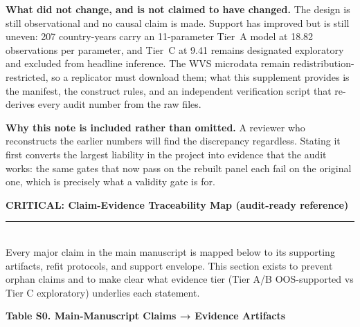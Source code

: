 \documentclass[11pt]{article}
\newcommand{\SubRule}{\color{black}\rule{\linewidth}{0.4pt}}
\newcommand{\Section}[1]{\noindent\textbf{#1}\\[-0.25em]\SubRule\\[0.1em]}
\begin{document}
\noindent\justifying
\textbf{What did not change, and is not claimed to have changed.} The design is still observational and no causal claim is made. Support has improved but is still uneven: 207 country-years carry an 11-parameter Tier~A model at 18.82 observations per parameter, and Tier~C at 9.41 remains designated exploratory and excluded from headline inference. The WVS microdata remain redistribution-restricted, so a replicator must download them; what this supplement provides is the manifest, the construct rules, and an independent verification script that re-derives every audit number from the raw files.

\noindent\justifying
\textbf{Why this note is included rather than omitted.} A reviewer who reconstructs the earlier numbers will find the discrepancy regardless. Stating it first converts the largest liability in the project into evidence that the audit works: the same gates that now pass on the rebuilt panel each fail on the original one, which is precisely what a validity gate is for.

\Section{CRITICAL: Claim-Evidence Traceability Map (audit-ready reference)}

Every major claim in the main manuscript is mapped below to its supporting artifacts, refit protocols, and support envelope. This section exists to prevent orphan claims and to make clear what evidence tier (Tier A/B OOS-supported vs Tier C exploratory) underlies each statement.

\begin{center}
{\small\textbf{Table S0. Main-Manuscript Claims → Evidence Artifacts}}
\end{center}

\vspace{-0.3em}
\end{document}
